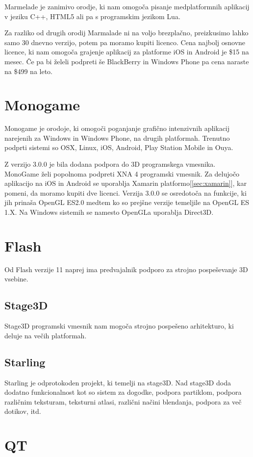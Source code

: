 Marmelade je zanimivo orodje, ki nam omogoča pisanje medplatformnih aplikacij v jeziku C++, HTML5 ali pa s programskim jezikom Lua.

Za razliko od drugih orodij Marmalade ni na voljo brezplačno, preizkusimo lahko samo 30 dnevno verzijo, potem pa moramo kupiti licenco. Cena najbolj osnovne licence, ki nam omogoča grajenje aplikacij za platforme iOS in Android je \$15 na mesec. Če pa bi želeli podpreti še BlackBerry in Windows Phone pa cena naraste na \$499 na leto.



\section{Monogame}

Monogame je orodoje, ki omogoči poganjanje grafično intenzivnih aplikacij narejenih za Windows in Windows Phone, na drugih platformah. Trenutno podprti sistemi so OSX, Linux, iOS, Android, Play Station Mobile in Ouya. 

Z verzijo 3.0.0 je bila dodana podpora do 3D programskega vmesnika. MonoGame želi popolnoma podpreti XNA 4 programski vmesnik. Za delujočo aplikacijo na iOS in Android se uporablja Xamarin platformo[\ref{sec:xamarin}], kar pomeni, da moramo kupiti dve licenci. Verzija 3.0.0 se osredotoča na funkcije, ki jih prinaša OpenGL ES2.0 medtem ko so prejšne verzije temeljile na OpenGL ES 1.X. Na Windows sistemih se namesto OpenGLa uporablja Direct3D.

\section{Flash}

Od Flash verzije 11 naprej ima predvajalnik podporo za strojno pospeševanje 3D vsebine.


\subsection{Stage3D}

Stage3D programski vmesnik nam mogoča strojno pospešeno arhitekturo, ki deluje na večih platformah. 

\subsection{Starling}

Starling je odprotokoden projekt, ki temelji na stage3D. Nad stage3D doda dodatno funkcionalnost kot so sistem za dogodke, podpora partiklom, podpora različnim teksturam, teksturni atlasi, različni načini blendanja, podpora za več dotikov, itd.

\section{QT}
\label{sec:qt}
